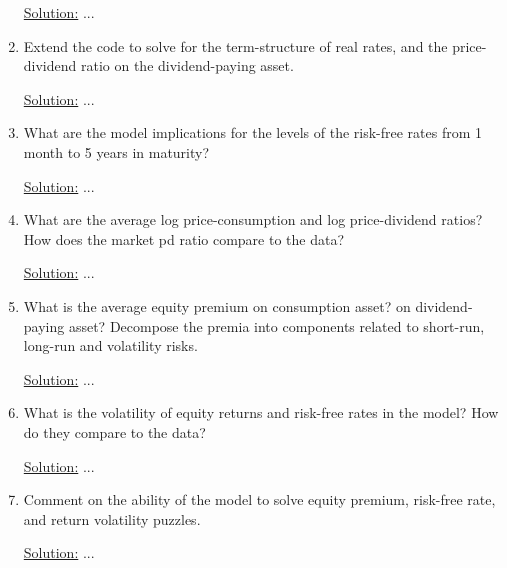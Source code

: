 \documentclass{article}
\begin{document}
\begin{enumerate}
\bigskip

\underline{Solution:}  ...

\bigskip

\item  Extend the code to solve for the term-structure of real rates, and the price-dividend ratio on the dividend-paying asset.

\bigskip

\underline{Solution:}  ...

\bigskip

\item  What are the model implications for the levels of the risk-free rates from 1 month to 5 years in maturity?

\bigskip

\underline{Solution:} ...

\bigskip

\item  What are the average log price-consumption and log price-dividend ratios? How does the market pd ratio compare to the data?

\bigskip

\underline{Solution:} ...

\bigskip

\item What is the average equity premium on consumption asset? on dividend-paying asset? Decompose the premia into components related to short-run, long-run and volatility risks.

\bigskip

\underline{Solution:}  ...

\bigskip

\item  What is the volatility of equity returns and risk-free rates in the model? How do they compare to the data?

\bigskip

\underline{Solution:} ...

\bigskip

\item  Comment on the ability of the model to solve equity premium, risk-free rate, and return volatility puzzles.

\bigskip

\underline{Solution:}  ...

\end{enumerate}
\end{document}
